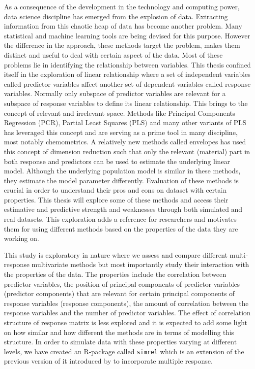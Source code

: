\documentclass[11pt,twoside,openright,titlepage,
  headinclude,footinclude,BCOR=5mm,
  numbers=noenddot,cleardoublepage=empty,
  tablecaptionabove, dottedtoc,
  bibliography=totoc]{scrreprt}
\begin{document}
As a consequence of the development in the technology and computing power, data science discipline has emerged from the explosion of data. Extracting information from this chaotic heap of data has become another problem. Many statistical and machine learning tools are being devised for this purpose. However the difference in the approach, these methods target the problem, makes them distinct and useful to deal with certain aspect of the data. Most of these problems lie in identifying the relationship between variables. This thesis confined itself in the exploration of linear relationship where a set of independent variables called predictor variables affect another set of dependent variables called response variables. Normally only subspace of predictor variables are relevant for a subspace of response variables to define its linear relationship. This brings to the concept of relevant and irrelevant space. Methods like Principal Components Regression (PCR), Partial Least Squares (PLS) and many other variants of PLS has leveraged this concept and are serving as a prime tool in many discipline, most notably chemometrics. A relatively new methods called envelopes has used this concept of dimension reduction such that only the relevant (material) part in both response and predictors can be used to estimate the underlying linear model. Although the underlying population model is similar in these methods, they estimate the model parameter differently. Evaluation of these methods is crucial in order to understand their pros and cons on dataset with certain properties. This thesis will explore some of these methods and access their estimative and predictive strength and weaknesses through both simulated and real datasets. This exploration adds a reference for researchers and motivates them for using different methods based on the properties of the data they are working on.

This study is exploratory in nature where we assess and compare different multi-response multivariate methods but most importantly study their interaction with the properties of the data. The properties include the correlation between predictor variables, the position of principal components of predictor variables (predictor components) that are relevant for certain principal components of response variables (response components), the amount of correlation between the response variables and the number of predictor variables. The effect of correlation structure of response matrix is less explored and it is expected to add some light on how similar and how different the methods are in terms of modelling this structure. In order to simulate data with these properties varying at different levels, we have created an R-package called \texttt{simrel} which is an extension of the previous version of it introduced by \citet{saebo2015simrel} to incorporate multiple response.
\end{document}
